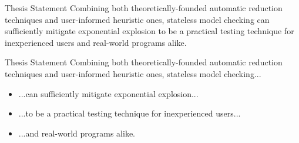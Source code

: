 \documentclass[xcolor=dvipsnames]{beamer}
\newcommand\hilight[2]{\color{#1}#2\color{black}}
\begin{document}
\begin{frame}{Thesis Statement}
	Combining both theoretically-founded automatic reduction techniques
	and user-informed heuristic ones,
	stateless model checking can sufficiently mitigate exponential explosion to be
	a practical testing technique for inexperienced users
	and real-world programs alike.
\end{frame}

\begin{frame}{Thesis Statement}
	\hilight{gray}{Combining both theoretically-founded automatic reduction techniques
	and user-informed heuristic ones, stateless model checking...}
	\begin{itemize}
		\item ...can sufficiently mitigate exponential explosion...
		\item ...to be a practical testing technique for inexperienced users...
		\item ...and real-world programs alike.
	\end{itemize}
\end{frame}
\end{document}
